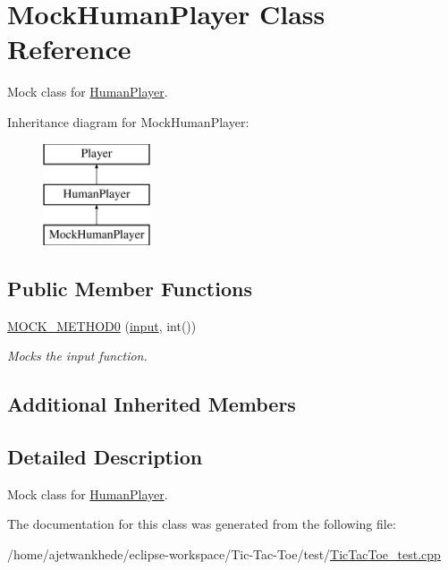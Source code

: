 \hypertarget{classMockHumanPlayer}{}\section{Mock\+Human\+Player Class Reference}
\label{classMockHumanPlayer}


Mock class for \mbox{\hyperlink{classHumanPlayer}{Human\+Player}}.  


Inheritance diagram for Mock\+Human\+Player\+:\begin{figure}[H]
\begin{center}
\leavevmode
\includegraphics[height=3.000000cm]{classMockHumanPlayer}
\end{center}
\end{figure}
\subsection*{Public Member Functions}
\begin{DoxyCompactItemize}
\item 
\mbox{\label{classMockHumanPlayer_a281cd3d9952cdba48ee355f85c28c09e}} 
\mbox{\hyperlink{classMockHumanPlayer_a281cd3d9952cdba48ee355f85c28c09e}{M\+O\+C\+K\+\_\+\+M\+E\+T\+H\+O\+D0}} (\mbox{\hyperlink{classHumanPlayer_a8281fe260b25edc4451fd15ae182707f}{input}}, int())
\begin{DoxyCompactList}\small\item\em Mocks the input function. \end{DoxyCompactList}\end{DoxyCompactItemize}
\subsection*{Additional Inherited Members}


\subsection{Detailed Description}
Mock class for \mbox{\hyperlink{classHumanPlayer}{Human\+Player}}. 

The documentation for this class was generated from the following file\+:\begin{DoxyCompactItemize}
\item 
/home/ajetwankhede/eclipse-\/workspace/\+Tic-\/\+Tac-\/\+Toe/test/\mbox{\hyperlink{TicTacToe__test_8cpp}{Tic\+Tac\+Toe\+\_\+test.\+cpp}}\end{DoxyCompactItemize}
